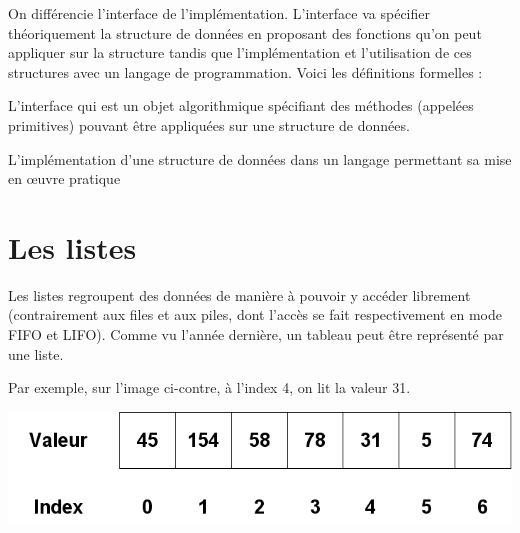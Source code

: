 

On différencie l'interface de l'implémentation. L'interface va spécifier théoriquement la structure de données en proposant des fonctions qu'on peut appliquer sur la structure tandis que l'implémentation et l'utilisation de ces structures avec un langage de programmation. Voici les définitions formelles :

\begin{tcolorbox}[enhanced,
    colback=green!25!black!10!white,colframe=green!75!black,title=L'interface,
    drop fuzzy shadow,watermark color=white]
    L'interface qui est un objet algorithmique spécifiant des méthodes (appelées primitives) pouvant être appliquées sur une structure de données.
\end{tcolorbox}

\begin{tcolorbox}[enhanced,
    colback=green!25!black!10!white,colframe=green!75!black,title=L'implémentation,
    drop fuzzy shadow,watermark color=white]
    L'implémentation d'une structure de données dans un langage permettant sa mise en œuvre pratique
\end{tcolorbox}

\newpage
\section{Les listes}

Les listes regroupent des données de manière à pouvoir y accéder librement (contrairement aux files et aux piles, dont l'accès se fait respectivement en mode FIFO et LIFO). Comme vu l'année dernière, un tableau peut être représenté par une liste.\\

\begin{minipage}{0.45\linewidth}
    Par exemple, sur l'image ci-contre, à l'index 4, on lit la valeur 31. 
\end{minipage}\begin{minipage}{0.49\linewidth}
    \begin{center}
        \includegraphics*[width=\linewidth]{Thème 1 – Structures de données/Chapitre 1 - Interface et implémentation/BLOB/Tableau_une_dimension.png}
    \end{center}
\end{minipage}

